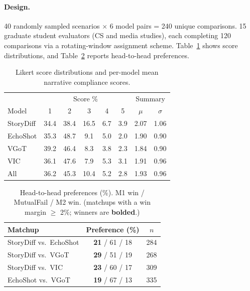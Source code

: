 \documentclass[sigconf,review,anonymous]{acmart}
\begin{document}
\paragraph{Design.}
40 randomly sampled scenarios $\times$ 6 model pairs = 240 unique comparisons. 15 graduate student evaluators (CS and media studies), each completing 120 comparisons via a rotating-window assignment scheme. Table~\ref{tab:score_dist} shows score distributions, and Table~\ref{tab:head_to_head} reports head-to-head preferences.
\begin{table}[H]
\caption{Likert score distributions and per-model mean narrative compliance scores.}
\label{tab:score_dist}
\centering
\small
\begin{tabular}{@{}lccccccc@{}}
\toprule
& \multicolumn{5}{c}{Score \%} & \multicolumn{2}{c}{Summary} \\
Model & 1 & 2 & 3 & 4 & 5 & $\mu$ & $\sigma$ \\
\midrule
StoryDiff    & 34.4 & 38.4 & 16.5 & 6.7 & 3.9 & 2.07 & 1.06 \\
EchoShot  & 35.3 & 48.7 & 9.1 & 5.0 & 2.0 & 1.90 & 0.90 \\
VGoT  & 39.2 & 46.4 & 8.3 & 3.8 & 2.3 & 1.84 & 0.90 \\
VIC   & 36.1 & 47.6 & 7.9 & 5.3 & 3.1 & 1.91 & 0.96 \\
\midrule
All   & 36.2 & 45.3 & 10.4 & 5.2 & 2.8 & 1.93 & 0.96 \\
\bottomrule
\end{tabular}
\end{table}

\begin{table}[H]
\caption{Head-to-head preferences (\%). M1 win / MutualFail / M2 win. (matchups with a win margin $\ge$ 2\%; winners are \textbf{bolded}.)}
\label{tab:head_to_head}
\centering
\small
\setlength{\tabcolsep}{3pt}
\begin{tabular}{@{}lcc@{}}
\toprule
Matchup & Preference (\%) & $n$ \\
\midrule
StoryDiff vs.\ EchoShot  & \textbf{21} / 61 / 18 & 284 \\
StoryDiff vs.\ VGoT      & \textbf{29} / 51 / 19 & 268 \\
StoryDiff vs.\ VIC       & \textbf{23} / 60 / 17 & 309 \\
EchoShot vs.\ VGoT       & \textbf{19} / 67 / 13 & 335 \\
\bottomrule
\end{tabular}
\end{table}
\end{document}

